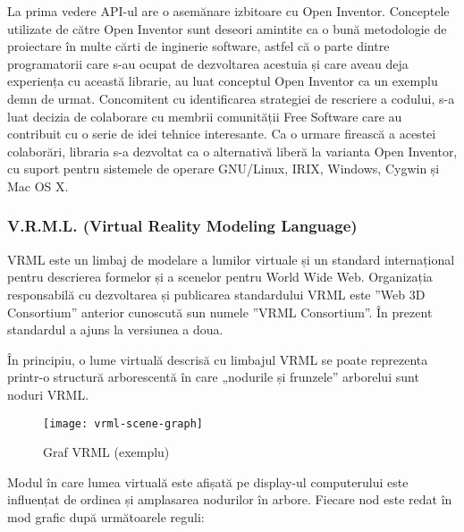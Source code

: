 \par La prima vedere API-ul are o asemănare izbitoare cu Open Inventor. Conceptele utilizate de către Open Inventor sunt deseori amintite ca o bună metodologie de proiectare în multe cărti de inginerie software, astfel că o parte dintre programatorii care s-au ocupat de dezvoltarea acestuia și care aveau deja experiența cu această librarie, au luat conceptul Open Inventor ca un exemplu demn de urmat. Concomitent cu identificarea strategiei de rescriere a codului, s-a luat decizia de colaborare cu membrii comunității Free Software care au contribuit cu o serie de idei tehnice interesante. Ca o urmare firească a acestei colaborări, libraria s-a dezvoltat ca o alternativă liberă la varianta Open Inventor, cu suport pentru sistemele de operare GNU/Linux, IRIX, Windows, Cygwin și Mac OS X.\cite{COIN_COMM}

\subsubsection{V.R.M.L. (Virtual Reality Modeling Language)}
\par VRML este un limbaj de modelare a lumilor virtuale și un standard internațional pentru descrierea formelor și a scenelor pentru World Wide Web. Organizația responsabilă cu dezvoltarea și publicarea standardului VRML este ”Web 3D Consortium” anterior cunoscută sun numele ”VRML Consortium”. În prezent standardul a ajuns la versiunea a doua.
\par În principiu, o lume virtuală descrisă cu limbajul VRML se poate reprezenta printr-o structură arborescentă în care „nodurile și frunzele” arborelui sunt noduri VRML. \cite{VRML}

\begin{figure}[h]
    \centering
    \texttt{[image: vrml-scene-graph]}
    \caption{Graf VRML (exemplu)}
    \label{fig:graphvrml}
\end{figure}

\par Modul în care lumea virtuală este afișată pe display-ul computerului  este influențat de ordinea și amplasarea nodurilor în arbore. Fiecare nod este redat în mod grafic după următoarele reguli:\cite{NADEAU} \cite{NADEAU2}

